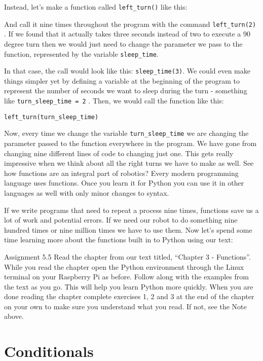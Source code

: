 \documentclass[
]{book}
\begin{document}
Instead, let's make a function called \texttt{left\_turn()} like this:

And call it nine times throughout the program with the command \texttt{left\_turn(2)} . If we found that it actually takes three seconds instead of two to execute a 90 degree turn then we would just need to change the parameter we pass to the function, represented by the variable \texttt{sleep\_time}.

In that case, the call would look like this: \texttt{sleep\_time(3)}. We could even make things simpler yet by defining a variable at the beginning of the program to represent the number of seconds we want to sleep during the turn - something like \texttt{turn\_sleep\_time\ =\ 2} . Then, we would call the function like this:

\texttt{left\_turn(turn\_sleep\_time)}

Now, every time we change the variable \texttt{turn\_sleep\_time} we are changing the parameter passed to the function everywhere in the program. We have gone from changing nine different lines of code to changing just one. This gets really impressive when we think about all the right turns we have to make as well. See how functions are an integral part of robotics? Every modern programming language uses functions. Once you learn it for Python you can use it in other languages as well with only minor changes to syntax.

If we write programs that need to repeat a process nine times, functions save us a lot of work and potential errors. If we need our robot to do something nine hundred times or nine million times we have to use them. Now let's spend some time learning more about the functions built in to Python using our text:

Assignment 5.5
Read the chapter from our text titled, ``Chapter 3 - Functions''. While you read the chapter open the Python environment through the Linux terminal on your Raspberry Pi as before. Follow along with the examples from the text as you go. This will help you learn Python more quickly. When you are done reading the chapter complete exercises 1, 2 and 3 at the end of the chapter on your own to make sure you understand what you read. If not, see the Note above.

\hypertarget{conditionals}{%
\section{Conditionals}\label{conditionals}}
\end{document}
